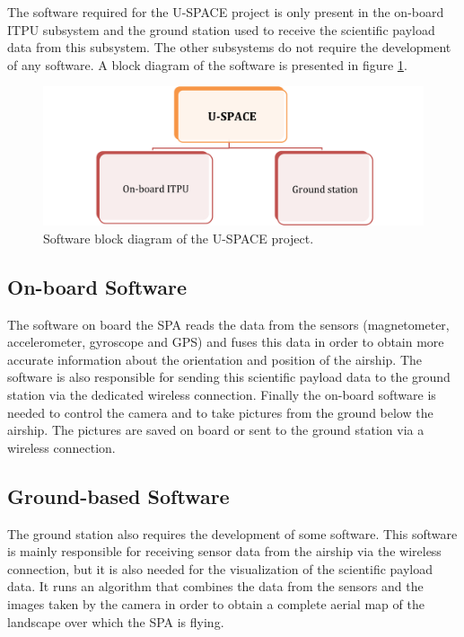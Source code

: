 The software required for the \ac{U-SPACE} project is only present in the on-board \ac{ITPU} subsystem and the ground station used to receive the scientific payload data from this subsystem. The other subsystems do not require the development of any software. A block diagram of the software is presented in figure \ref{fig:software_block}.

\begin{figure}[htbp!]
\centering
\includegraphics[width=\textwidth]{figures/software_block.png}
\caption{Software block diagram of the U-SPACE project.}
\label{fig:software_block}
\end{figure}

\subsection{On-board Software}

The software on board the \ac{SPA} reads the data from the sensors (magnetometer, accelerometer, gyroscope and \ac{GPS}) and fuses this data in order to obtain more accurate information about the orientation and position of the airship. The software is also responsible for sending this scientific payload data to the ground station via the dedicated wireless connection. Finally the on-board software is needed to control the camera and to take pictures from the ground below the airship. The pictures are saved on board or sent to the ground station via a wireless connection.

\subsection{Ground-based Software}

The ground station also requires the development of some software. This software is mainly responsible for receiving sensor data from the airship via the wireless connection, but it is also needed for the visualization of the scientific payload data. It runs an algorithm that combines the data from the sensors and the images taken by the camera in order to obtain a complete aerial map of the landscape over which the \ac{SPA} is flying.

